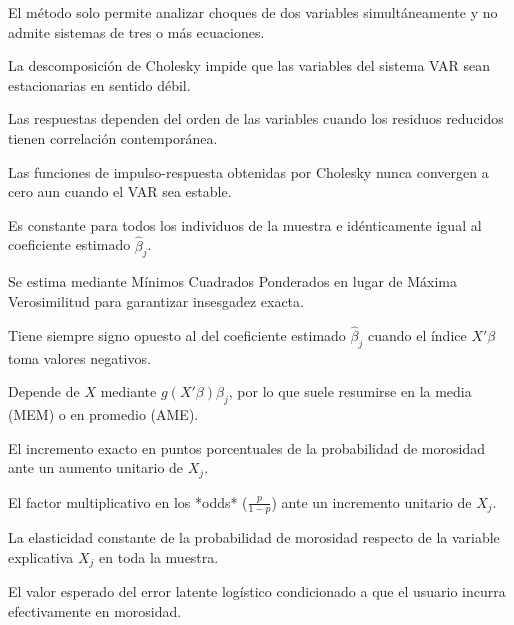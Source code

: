 \begin{opts}
    \item El método solo permite analizar choques de dos variables simultáneamente y no admite sistemas de tres o más ecuaciones.
    \item La descomposición de Cholesky impide que las variables del sistema VAR sean estacionarias en sentido débil.
    \item Las respuestas dependen del orden de las variables cuando los residuos reducidos tienen correlación contemporánea.
    \item Las funciones de impulso-respuesta obtenidas por Cholesky nunca convergen a cero aun cuando el VAR sea estable.
\end{opts}

\begin{opts}
    \item Es constante para todos los individuos de la muestra e idénticamente igual al coeficiente estimado $\hat{\beta}_j$.
    \item Se estima mediante Mínimos Cuadrados Ponderados en lugar de Máxima Verosimilitud para garantizar insesgadez exacta.
    \item Tiene siempre signo opuesto al del coeficiente estimado $\hat{\beta}_j$ cuando el índice $X'\beta$ toma valores negativos.
    \item Depende de $X$ mediante $g(X'\beta)\beta_j$, por lo que suele resumirse en la media (MEM) o en promedio (AME).
\end{opts}

\begin{opts}
    \item El incremento exacto en puntos porcentuales de la probabilidad de morosidad ante un aumento unitario de $X_j$.
    \item El factor multiplicativo en los *odds* ($\frac{p}{1-p}$) ante un incremento unitario de $X_j$.
    \item La elasticidad constante de la probabilidad de morosidad respecto de la variable explicativa $X_j$ en toda la muestra.
    \item El valor esperado del error latente logístico condicionado a que el usuario incurra efectivamente en morosidad.
\end{opts}

